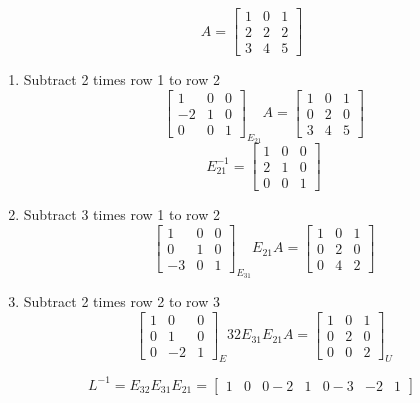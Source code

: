 \[
  A = 
  \begin{bmatrix}
    1 & 0 & 1 \\ 
    2 & 2 & 2 \\
    3 & 4 & 5
  \end{bmatrix}
\]

\begin{enumerate}
  \item Subtract 2 times row 1 to row 2
  \[
    \begin{bmatrix}
      1 & 0 & 0 \\ 
      -2 & 1 & 0 \\
      0 & 0 & 1
    \end{bmatrix}_{E_{21}} A =
    \begin{bmatrix}
      1 & 0 & 1 \\ 
      0 & 2 & 0 \\
      3 & 4 & 5
    \end{bmatrix}
  \]
  \[
    E_{21}^{-1} = \begin{bmatrix}
      1 & 0 & 0 \\ 
      2 & 1 & 0 \\
      0 & 0 & 1
    \end{bmatrix}
  \]
  \item Subtract 3 times row 1 to row 2
  \[
    \begin{bmatrix}
      1 & 0 & 0 \\ 
      0 & 1 & 0 \\
      -3 & 0 & 1
    \end{bmatrix}_{E_{31}} E_{21} A =
    \begin{bmatrix}
      1 & 0 & 1 \\ 
      0 & 2 & 0 \\
      0 & 4 & 2
    \end{bmatrix}
  \]
  \item Subtract 2 times row 2 to row 3
  \[
    \begin{bmatrix}
      1 & 0 & 0 \\ 
      0 & 1 & 0 \\
      0 & -2 & 1
    \end{bmatrix}_E{32} E_{31} E_{21} A =
    \begin{bmatrix}
      1 & 0 & 1 \\ 
      0 & 2 & 0 \\
      0 & 0 & 2
    \end{bmatrix}_U
  \]
\end{enumerate}

\[
  L^{-1} = E_{32} E_{31} E_{21} = \begin{bmatrix}
    1 & 0 & 0
    -2 & 1 & 0
    -3 & -2 & 1
  \end{bmatrix}
\]

